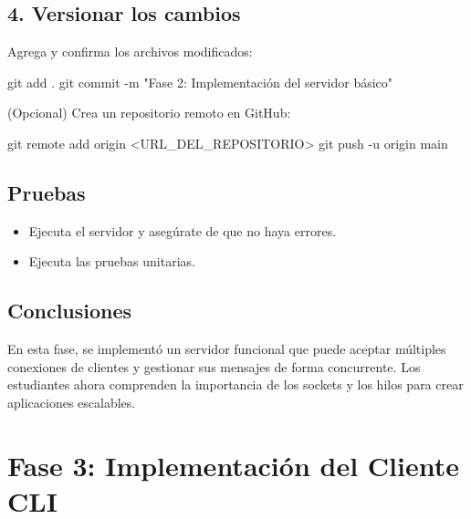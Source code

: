 \documentclass[
  a4paper,
  DIV=11,
  numbers=noendperiod,
  onepage,
  openany]{scrreprt}
\newenvironment{Shaded}{\begin{snugshade}}{\end{snugshade}}
\newcommand{\AttributeTok}[1]{\textcolor[rgb]{0.40,0.45,0.13}{#1}}
\newcommand{\FunctionTok}[1]{\textcolor[rgb]{0.28,0.35,0.67}{#1}}
\newcommand{\NormalTok}[1]{\textcolor[rgb]{0.00,0.23,0.31}{#1}}
\newcommand{\OperatorTok}[1]{\textcolor[rgb]{0.37,0.37,0.37}{#1}}
\newcommand{\StringTok}[1]{\textcolor[rgb]{0.13,0.47,0.30}{#1}}
\providecommand{\tightlist}{%
  \setlength{\itemsep}{0pt}\setlength{\parskip}{0pt}}\usepackage{longtable,booktabs,array}
\begin{document}
\section{4. Versionar los cambios}\label{versionar-los-cambios}

Agrega y confirma los archivos modificados:

\begin{Shaded}
\begin{Highlighting}[]
\FunctionTok{git}\NormalTok{ add .}
\FunctionTok{git}\NormalTok{ commit }\AttributeTok{{-}m} \StringTok{"Fase 2: Implementación del servidor básico"}
\end{Highlighting}
\end{Shaded}

(Opcional) Crea un repositorio remoto en GitHub:

\begin{Shaded}
\begin{Highlighting}[]
\FunctionTok{git}\NormalTok{ remote add origin }\OperatorTok{\textless{}}\NormalTok{URL\_DEL\_REPOSITORIO}\OperatorTok{\textgreater{}}
\FunctionTok{git}\NormalTok{ push }\AttributeTok{{-}u}\NormalTok{ origin main}
\end{Highlighting}
\end{Shaded}

\section{Pruebas}\label{pruebas-1}

\begin{itemize}
\tightlist
\item
  Ejecuta el servidor y asegúrate de que no haya errores.
\item
  Ejecuta las pruebas unitarias.
\end{itemize}

\section{Conclusiones}\label{conclusiones-15}

En esta fase, se implementó un servidor funcional que puede aceptar
múltiples conexiones de clientes y gestionar sus mensajes de forma
concurrente. Los estudiantes ahora comprenden la importancia de los
sockets y los hilos para crear aplicaciones escalables.

\chapter{Fase 3: Implementación del Cliente
CLI}\label{fase-3-implementaciuxf3n-del-cliente-cli}
\end{document}
